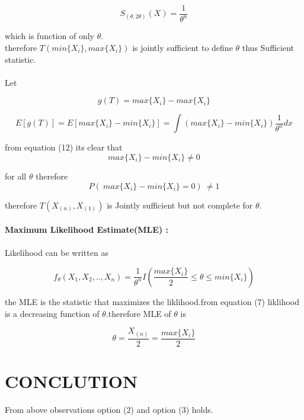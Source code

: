 \documentclass[journal,12pt,twocolumn]{IEEEtran}
\begin{document}
\begin{equation}
    S_{(\theta,2\theta)}(X)=\frac{1}{\theta^n}
\end{equation}

 which is function of only $\theta$.\\
therefore $T(min\{X_i\},max\{X_i\})$ is jointly sufficient to define $\theta$ thus Sufficient statistic.\\ \\
Let 

\begin{equation}
     g(T)=max\{X_i\}-max\{X_i\}
\end{equation}

\begin{equation}
    E[g(T)]=E[max\{X_i\}-min\{X_i\}]=\int (max\{X_i\}-min\{X_i\})\frac{1}{\theta^n}dx
\end{equation}

from equation (12) its clear that
\begin{equation}
    max\{X_i\}-min\{X_i\}\neq0
\end{equation}

for all $\theta$ therefore 
\begin{equation}
    P(\ max\{X_i\}-min\{X_i\}=0 )\ \neq1
\end{equation}

therefore $T(X_{(n)},X_{(1)})$ is Jointly sufficient but not complete for $\theta$. \\ \\
\textbf{Maximum Likelihood Estimate(MLE) :}\\ \\
Likelihood can be written as 

\begin{equation}
    f_\theta(X_1,X_2,..,X_n)=\frac{1}{\theta^n}I\left( \frac{max     \{X_i\}}{2}\leq\theta\leq min\{X_i\}\right)
\end{equation}

the MLE is the statistic that maximizes the liklihood.from equation (7) liklihood is a decreasing function of $\theta$.therefore MLE of $\theta$ is 

\begin{equation}
    \theta=\frac{X_{(n)}}{2}=\frac{max\{X_i\}}{2}
\end{equation}

\section{\textbf{CONCLUTION}}
From above observations option (2) and option (3) holds.
\end{document}
